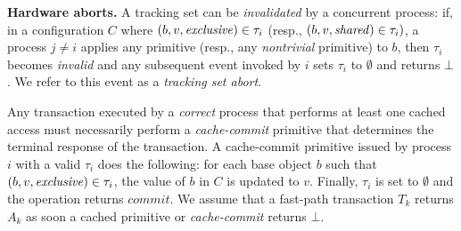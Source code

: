 %
\textbf{Hardware aborts.}
A tracking set can be \emph{invalidated} by a concurrent process: 
if, in a configuration $C$ where  $(b,v,\mathit{exclusive})\in\tau_i$
(resp., $(b,v,\mathit{shared})\in\tau_i)$,  a process $j\neq i$ applies any primitive 
(resp., any \emph{nontrivial} primitive) to $b$, then $\tau_i$ becomes
\emph{invalid} and any subsequent event invoked by $i$
sets $\tau_i$ to $\emptyset$ and returns $\bot$. We refer to this event as a \emph{tracking set abort}.

Any transaction executed by a \emph{correct} process that performs at least one cached access must necessarily perform a \emph{cache-commit} primitive 
that determines the terminal response of the transaction.
A cache-commit primitive
issued by process $i$ with
a valid $\tau_i$ does the following: for each base object $b$ such that $(b,v,\mathit{exclusive}) \in \tau_i$, the value of $b$ in $C$ is updated to $v$. 
Finally, $\tau_i$ is set to $\emptyset$ and the operation returns $\textit{commit}$. 
We assume that a fast-path transaction $T_k$ returns $A_k$
as soon a cached primitive or \emph{cache-commit} returns $\bot$.

